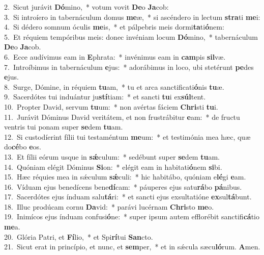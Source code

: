 {2.~}Sicut jurávit \textbf{Dó}mino,~* votum vovit \textbf{De}o \textbf{Ja}cob:\\
{3.~}Si introíero in tabernáculum domus \textbf{me}æ,~* si ascéndero in lectum \textbf{stra}ti \textbf{me}i:\\
{4.~}Si dédero somnum óculis \textbf{me}is,~* et pálpebris meis dormi\textbf{ta}ti\textbf{ó}nem:\\
{5.~}Et réquiem tempóribus meis: donec invéniam locum \textbf{Dó}mino,~* tabernáculum \textbf{De}o \textbf{Ja}cob.\\
{6.~}Ecce audívimus eam in \textbf{E}phrata:~* invénimus eam in \textbf{cam}pis \textbf{sil}væ.\\
{7.~}Introíbimus in tabernáculum \textbf{e}jus:~* adorábimus in loco, ubi stetérunt \textbf{pe}des \textbf{e}jus.\\
{8.~}Surge, Dómine, in réquiem \textbf{tu}am,~* tu et arca sanctificati\textbf{ó}nis \textbf{tu}æ.\\
{9.~}Sacerdótes tui induántur ju\textbf{stí}tiam:~* et sancti \textbf{tu}i ex\textbf{súl}tent.\\
{10.~}Propter David, servum \textbf{tu}um:~* non avértas fáciem \textbf{Chri}sti \textbf{tu}i.\\
{11.~}Jurávit Dóminus David veritátem, et non frustrábitur \textbf{e}am:~* de fructu ventris tui ponam super \textbf{se}dem \textbf{tu}am.\\
{12.~}Si custodíerint fílii tui testaméntum \textbf{me}um:~* et testimónia mea hæc, quæ do\textbf{cé}bo \textbf{e}os.\\
{13.~}Et fílii eórum usque in \textbf{sǽ}culum:~* sedébunt super \textbf{se}dem \textbf{tu}am.\\
{14.~}Quóniam elégit Dóminus \textbf{Si}on:~* elégit eam in habitati\textbf{ó}nem \textbf{si}bi.\\
{15.~}Hæc réquies mea in sǽculum \textbf{sǽ}culi:~* hic habitábo, quóniam e\textbf{lé}gi \textbf{e}am.\\
{16.~}Víduam ejus benedícens bene\textbf{dí}cam:~* páuperes ejus satu\textbf{rá}bo \textbf{pá}nibus.\\
{17.~}Sacerdótes ejus índuam salu\textbf{tá}ri:~* et sancti ejus exsultatióne \textbf{ex}sul\textbf{tá}bunt.\\
{18.~}Illuc prodúcam cornu \textbf{Da}vid:~* parávi lucérnam \textbf{Chri}sto \textbf{me}o.\\
{19.~}Inimícos ejus índuam confusi\textbf{ó}ne:~* super ipsum autem efflorébit sanctifi\textbf{cá}tio \textbf{me}a.\\
{20.~}Glória Patri, et \textbf{Fí}lio,~* et Spi\textbf{rí}tui \textbf{San}cto.\\
{21.~}Sicut erat in princípio, et nunc, et \textbf{sem}per,~* et in sǽcula sæcu\textbf{ló}rum. \textbf{A}men.\\
